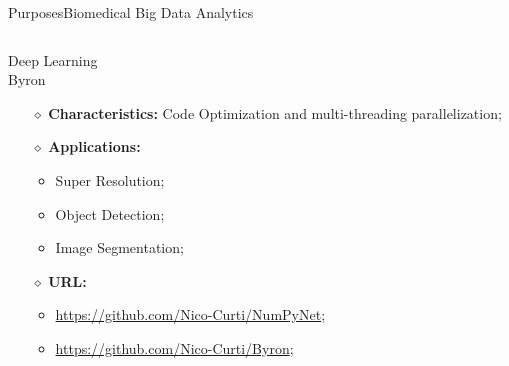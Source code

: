 \documentclass[10pt, technote, oribibl, unicode]{beamer}
\begin{document}
\begin{frame}{Purposes}{Biomedical Big Data Analytics}
\begin{columns}
\begin{column}{0.5\textwidth}
\begin{block}{Deep Learning\\Byron}
\begin{itemize}
          \item[$\diamond$] \textbf{Characteristics:} Code Optimization and multi-threading parallelization;

          \item[$\diamond$] \textbf{Applications:}
            \begin{itemize}
              \item Super Resolution;
              \item Object Detection;
              \item Image Segmentation;
            \end{itemize}

          \item[$\diamond$] \textbf{URL:}
            \begin{itemize}
              \item \tiny{\url{https://github.com/Nico-Curti/NumPyNet};}
              \item \tiny{\url{https://github.com/Nico-Curti/Byron};}
            \end{itemize}
        \end{itemize}
      \end{block}

    \end{column}

  \end{columns}


\end{frame}
\end{document}
